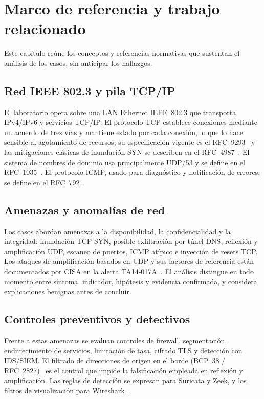 \chapter{Marco de referencia y trabajo relacionado}
\label{ch:marco}
Este cap\'itulo re\'une los conceptos y referencias normativas que sustentan el an\'alisis de los casos, sin anticipar los hallazgos.

\section{Red IEEE 802.3 y pila TCP/IP}
El laboratorio opera sobre una LAN Ethernet IEEE~802.3 que transporta IPv4/IPv6 y servicios TCP/IP. El protocolo TCP establece conexiones mediante un acuerdo de tres v\'ias y mantiene estado por cada conexi\'on, lo que lo hace sensible al agotamiento de recursos; su especificaci\'on vigente es el RFC~9293~\cite{rfc9293} y las mitigaciones cl\'asicas de inundaci\'on SYN se describen en el RFC~4987~\cite{rfc4987}. El sistema de nombres de dominio usa principalmente UDP/53 y se define en el RFC~1035~\cite{rfc1035}. El protocolo ICMP, usado para diagn\'ostico y notificaci\'on de errores, se define en el RFC~792~\cite{rfc792}.

\section{Amenazas y anomal\'ias de red}
Los casos abordan amenazas a la disponibilidad, la confidencialidad y la integridad: inundaci\'on TCP SYN, posible exfiltraci\'on por t\'unel DNS, reflexi\'on y amplificaci\'on UDP, escaneo de puertos, ICMP at\'ipico e inyecci\'on de resets TCP. Los ataques de amplificaci\'on basados en UDP y sus factores de referencia est\'an documentados por CISA en la alerta TA14-017A~\cite{cisa}. El an\'alisis distingue en todo momento entre s\'intoma, indicador, hip\'otesis y evidencia confirmada, y considera explicaciones benignas antes de concluir.

\section{Controles preventivos y detectivos}
Frente a estas amenazas se evaluan controles de firewall, segmentaci\'on, endurecimiento de servicios, limitaci\'on de tasa, cifrado TLS y detecci\'on con IDS/SIEM. El filtrado de direcciones de origen en el borde (BCP~38 / RFC~2827)~\cite{bcp38} es el control que impide la falsificaci\'on empleada en reflexi\'on y amplificaci\'on. Las reglas de detecci\'on se expresan para Suricata y Zeek, y los filtros de visualizaci\'on para Wireshark~\cite{tools}.

